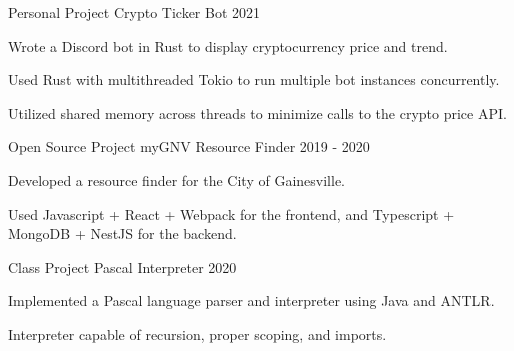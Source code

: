 

\begin{cventries}

  \cventry
    {Personal Project} %
    {Crypto Ticker Bot} %
    {} %
    {2021} %
    {
      \begin{cvitems} %
        \item {Wrote a Discord bot in Rust to display cryptocurrency price and trend.}
        \item {Used Rust with multithreaded Tokio to run multiple bot instances concurrently.}
        \item {Utilized shared memory across threads to minimize calls to the crypto price API.}
      \end{cvitems}
    }

  \cventry
    {Open Source Project} %
    {myGNV Resource Finder} %
    {} %
    {2019 - 2020} %
    {
    \begin{cvitems} %
        \item {Developed a resource finder for the City of Gainesville.}
        \item {Used Javascript + React + Webpack for the frontend, and Typescript + MongoDB + NestJS for the backend.}
    \end{cvitems}
    }


  \cventry
    {Class Project} %
    {Pascal Interpreter} %
    {} %
    {2020} %
    {
      \begin{cvitems} %
        \item {Implemented a Pascal language parser and interpreter using Java and ANTLR.}
        \item {Interpreter capable of recursion, proper scoping, and imports.}
      \end{cvitems}
    }


\end{cventries}
